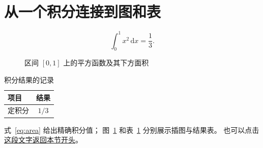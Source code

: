 \documentclass[UTF8,11pt,a4paper,linespread=1]{ctexart}
\begin{document}
\section{从一个积分连接到图和表}\label{sec:demo}
\begin{equation}\label{eq:area}
  \int_0^1 x^2\,\mathrm{d}x=\frac13.
\end{equation}

\begin{figure}[htbp]
  \centering
  \caption{区间 $[0,1]$ 上的平方函数及其下方面积}\label{fig:demo}
\end{figure}

\begin{table}[htbp]
  \centering
  \caption{积分结果的记录}\label{tab:result}
  \begin{tabular}{lc}
    \toprule
    项目 & 结果 \\
    \midrule
    定积分 & $1/3$ \\
    \bottomrule
  \end{tabular}
\end{table}

式~\eqref{eq:area} 给出精确积分值；
图~\ref{fig:demo} 和表~\ref{tab:result} 分别展示插图与结果表。
也可以点击\hyperref[sec:demo]{这段文字返回本节开头}。
\end{document}
